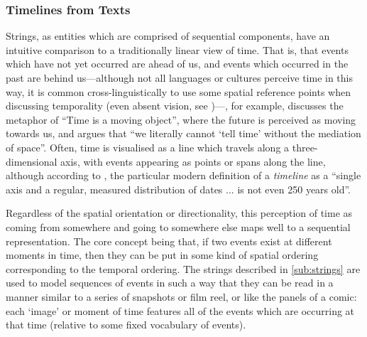 \documentclass[a4paper,12pt,leqno]{article}
\newcommand{\selfnote}[1]{{\color{red}[NB\footnote{{\color{red}#1}}]}}
\newcommand{\nb}{\selfnote}
\begin{document}
\subsubsection{Timelines from Texts}\label{ssub:timelines}
Strings, as entities which are comprised of sequential components, have an intuitive comparison to a traditionally linear view of time. That is, that events which have not yet occurred are ahead of us, and events which occurred in the past are behind us---although not all languages or cultures perceive time in this way, it is common cross-linguistically to use some spatial reference points when discussing temporality
(even absent vision, see \citet{bottini2015space})---\citet[pp. 42--43]{lakoff2008metaphors}, for example, discusses the metaphor of ``Time is a moving object'', where the future is perceived as moving towards us, and \citet[p. 542]{mitchell1980spatial} argues that ``we literally cannot `tell time' without the mediation of space''. Often, time is visualised as a line which travels along a three-dimensional axis, with events appearing as points or spans along the line, although according to \citet[p. 14]{rosenberg2013cartographies}, the particular modern definition of a \textit{timeline} as a ``single axis and a regular, measured distribution of dates ... is not even 250 years old''.

Regardless of the spatial orientation or directionality, this perception of time as coming from somewhere and going to somewhere else maps well to a sequential representation. The core concept being that, if two events exist at different moments in time, then they can be put in some kind of spatial ordering corresponding to the temporal ordering. The strings described in \cref{sub:strings} are used to model sequences of events in such a way that they can be read in a manner similar to a series of snapshots or film reel, or like the panels of a comic: each `image' or moment of time features all of the events which are occurring at that time (relative to some fixed vocabulary of events).
\end{document}
